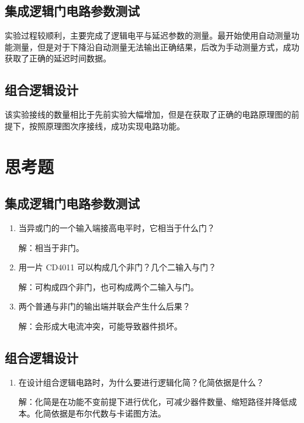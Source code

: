 \documentclass[a4paper,12pt]{article}
\begin{document}
\subsection{集成逻辑门电路参数测试}
实验过程较顺利，主要完成了逻辑电平与延迟参数的测量。最开始使用自动测量功能测量，但是对于下降沿自动测量无法输出正确结果，后改为手动测量方式，成功获取了正确的延迟时间数据。

\subsection{组合逻辑设计 }
该实验接线的数量相比于先前实验大幅增加，但是在获取了正确的电路原理图的前提下，按照原理图次序接线，成功实现电路功能。

\section{思考题}
\subsection{集成逻辑门电路参数测试}
\begin{enumerate}
    \item 当异或门的一个输入端接高电平时，它相当于什么门？

    解：相当于非门。

    \item 用一片 CD4011 可以构成几个非门？几个二输入与门？

    解：可构成四个非门，也可构成两个二输入与门。

    \item 两个普通与非门的输出端并联会产生什么后果？

    解：会形成大电流冲突，可能导致器件损坏。
\end{enumerate}

\subsection{组合逻辑设计 }
\begin{enumerate}
    \item 在设计组合逻辑电路时，为什么要进行逻辑化简？化简依据是什么？

    解：化简是在功能不变前提下进行优化，可减少器件数量、缩短路径并降低成本。化简依据是布尔代数与卡诺图方法。
\end{enumerate}
\end{document}
